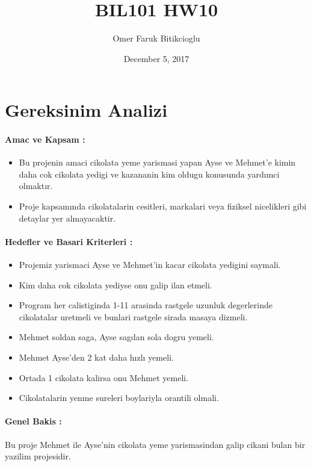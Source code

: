 \documentclass{article}
\title{BIL101 HW10}
\author{Omer Faruk Bitikcioglu}
\date{December 5, 2017}
\begin{document}
	\maketitle
	\newpage
	\section{Gereksinim Analizi}
	\paragraph{Amac ve Kapsam :}
	\begin{itemize}
		\item Bu projenin amaci cikolata yeme yarismasi yapan Ayse ve Mehmet'e kimin daha cok cikolata yedigi ve kazananin kim oldugu konusunda yardımci olmaktır.
		
		\item Proje kapsamında cikolatalarin cesitleri, markalari veya fiziksel nicelikleri gibi detaylar yer almayacaktir.
	\end{itemize}
	
	\paragraph{Hedefler ve Basari Kriterleri :}
	\begin{itemize}
		\item Projemiz yarismaci Ayse ve Mehmet'in kacar cikolata yedigini saymali.
		
		\item Kim daha cok cikolata yediyse onu galip ilan etmeli.
		
		\item Program her calistiginda 1-11 arasinda rastgele uzunluk degerlerinde cikolatalar uretmeli ve bunlari rastgele sirada masaya dizmeli.
		
		\item Mehmet soldan saga, Ayse sagdan sola dogru yemeli.
		
		\item Mehmet Ayse'den 2 kat daha hızlı yemeli.
		
		\item Ortada 1 cikolata kalirsa onu Mehmet yemeli.
		
		\item Cikolatalarin yenme sureleri boylariyla orantili olmali.
	\end{itemize}
	\paragraph{Genel Bakis :}
	Bu proje Mehmet ile Ayse'nin cikolata yeme yarismasindan galip cikani bulan bir yazilim projesidir.
	
\end{document}

